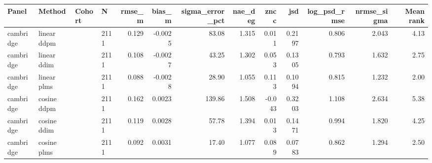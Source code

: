 \begin{tabular}{llllrrrrrrrrr}
\hline
Panel & Method & Cohort & N & rmse\_m & bias\_m & sigma\_error\_pct & nae\_deg & zncc & jsd & log\_psd\_rmse & nrmse\_sigma & Mean rank \\
\hline
cambridge & linear ddpm &  & 2111 & 0.129 & -0.0025 & 83.08 & 1.315 & 0.011 & 0.2197 & 0.806 & 2.043 & 4.13 \\
cambridge & linear ddim &  & 2111 & 0.108 & -0.0027 & 43.25 & 1.302 & 0.053 & 0.1305 & 0.793 & 1.632 & 2.75 \\
cambridge & linear plms &  & 2111 & 0.088 & -0.0028 & 28.90 & 1.055 & 0.113 & 0.1094 & 0.815 & 1.232 & 2.00 \\
cambridge & cosine ddpm &  & 2111 & 0.162 & 0.0023 & 139.86 & 1.508 & -0.043 & 0.3203 & 1.108 & 2.634 & 5.38 \\
cambridge & cosine ddim &  & 2111 & 0.119 & 0.0028 & 57.78 & 1.394 & 0.013 & 0.1471 & 0.994 & 1.820 & 4.25 \\
cambridge & cosine plms &  & 2111 & 0.092 & 0.0031 & 17.40 & 1.077 & 0.089 & 0.0783 & 0.862 & 1.294 & 2.50 \\
\hline
\end{tabular}
